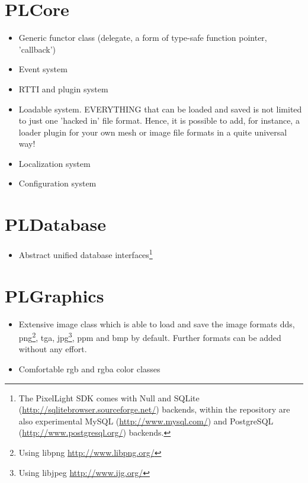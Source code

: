 \section{PLCore}
\begin{itemize}
\item{Generic functor class (delegate, a form of type-safe function pointer, 'callback')}
\item{Event system}
\item{RTTI and plugin system}
\item{Loadable system. EVERYTHING that can be loaded and saved is not limited to just one 'hacked in' file format. Hence, it is possible to add, for instance, a loader plugin for your own mesh or image file formats in a quite universal way!}
\item{Localization system}
\item{Configuration system}
\end{itemize}




\section{PLDatabase}
\begin{itemize}
\item{Abstract unified database interfaces\footnote{The PixelLight SDK comes with Null and SQLite (\url{http://sqlitebrowser.sourceforge.net/}) backends, within the repository are also experimental MySQL (\url{http://www.mysql.com/}) and PostgreSQL (\url{http://www.postgresql.org/}) backends.}}
\end{itemize}




\section{PLGraphics}
\begin{itemize}
\item{Extensive image class which is able to load and save the image formats dds, png\footnote{Using libpng \url{http://www.libpng.org/}}, tga, jpg\footnote{Using libjpeg \url{http://www.ijg.org/}}, ppm and bmp by default. Further formats can be added without any effort.}
\item{Comfortable rgb and rgba color classes}
\end{itemize}




